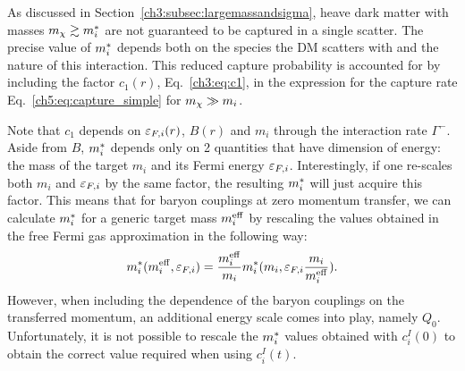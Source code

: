 As discussed in Section~\ref{ch3:subsec:largemassandsigma}, heave dark matter with masses $m_\chi \gtrsim m_i^*$ are not guaranteed to be captured in a single scatter. The precise value of $m_i^*$ depends both on the species the DM scatters with and the nature of this interaction.  
This reduced capture probability is accounted for by including the factor $c_1(r)$, Eq.~\ref{ch3:eq:c1}, in the expression for the capture rate Eq.~\ref{ch5:eq:capture_simple} for $m_\chi\gg m_i$. 

Note that $c_1$ depends on $\varepsilon_{F,i}(r)$, $B(r)$ and $m_i$ through the interaction rate $\Gamma^-$.
Aside from $B$, $m_i^*$ depends only on 2 quantities that have dimension of energy: the mass of the target $m_i$ and its Fermi energy $\varepsilon_{F,i}$. 
Interestingly, if one re-scales both $m_i$ and $\varepsilon_{F,i}$ by the same factor, the resulting $m_i^*$ will just acquire this factor. 
This means that for baryon couplings at zero momentum transfer, we can calculate $m_i^*$ for a generic target mass $m_i^{\rm eff}$ by rescaling the values obtained in the free Fermi gas approximation in the following way: 
\begin{equation}
m_i^*(m_i^{\rm eff}, \varepsilon_{F,i})= \frac{m_i^{\rm eff}}{m_i} m_i^*(m_i,\varepsilon_{F,i}\frac{m_i}{m_i^{\rm eff}}).
\end{equation}
However, when including the dependence of the baryon couplings on the transferred momentum, an additional energy scale comes into play, namely $Q_0$. Unfortunately, it is not possible to rescale the $m_i^*$ values obtained with $c_i^I(0)$ to obtain the correct value required when using $c_i^I(t)$.




